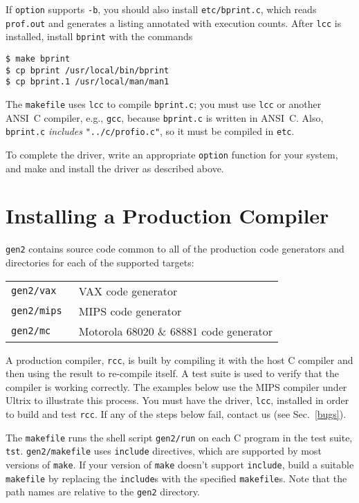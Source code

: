 If \verb|option| supports \verb|-b|, you should also
install \verb|etc/bprint.c|, which reads \verb|prof.out|
and generates a listing annotated with execution counts.
After \verb|lcc| is installed, install \verb|bprint| with the commands
\begin{verbatim}
$ make bprint
$ cp bprint /usr/local/bin/bprint
$ cp bprint.1 /usr/local/man/man1
\end{verbatim}
The \verb|makefile| uses \verb|lcc| to compile \verb|bprint.c|;
you must use \verb|lcc| or another ANSI~C compiler, e.g., \verb|gcc|,
because \verb|bprint.c| is written in ANSI~C.
Also, \verb|bprint.c| {\em includes\/} \verb|"../c/profio.c"|, so it must
be compiled in \verb|etc|.

To complete the driver,
write an appropriate \verb|option| function for your system,
and make and install the driver as described above.

\section{Installing a Production Compiler}\label{gen2}

\verb|gen2| contains source code common to all of the production
code generators and directories for each of the supported targets:

\begin{center}
\begin{tabular}{ll}
\tt gen2/vax	& VAX code generator \\
\tt gen2/mips	& MIPS code generator \\
\tt gen2/mc	& Motorola 68020 \& 68881 code generator \\
\end{tabular}
\end{center}

A production compiler, \verb|rcc|, is built by compiling it
with the host C compiler and then using the result to re-compile itself.
A test suite is used to
verify that the compiler is working correctly.
The examples below use the MIPS compiler under Ultrix
to illustrate this process.
You must have the driver, \verb|lcc|, installed in order
to build and test \verb|rcc|.
If any of the steps below fail, contact us (see Sec.~\ref{bugs}).

The \verb|makefile| runs the shell script
\verb|gen2/run| on each C program in the test suite, \verb|tst|.
\verb|gen2/makefile| uses \verb|include| directives, which are supported by
most versions of \verb|make|. If your version of \verb|make|
doesn't support \verb|include|, build a suitable \verb|makefile|
by replacing the \verb|include|s with the specified \verb|makefile|s.
Note that the path names are relative to the \verb|gen2| directory.


